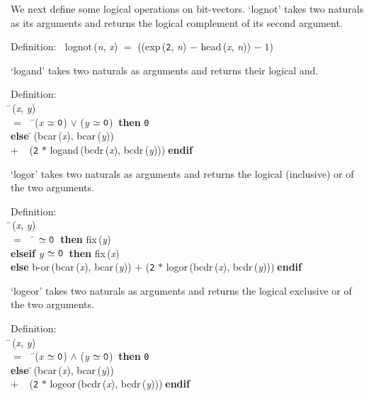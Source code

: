  We next define some logical operations on bit-vectors.  `lognot' takes
 two naturals as its arguments and returns the logical complement of its
 second argument.
\begin{tabbing}{\sc Definition}:$\;\;$
{\rm{lognot}}\,({\it{n\/}}, {\it{x\/}}) $=$ (({\rm{exp}}\,({\tt{2}}, {\it{n\/}}) $-$ {\rm{head}}\,({\it{x\/}}, {\it{n\/}})) $-\;1$)
\end{tabbing}

 `logand' takes two naturals as arguments and returns their logical and.
\begin{tabbing}{\sc Definition}: \\  
\=\,({\it{x\/}}, {\it{y\/}}) \\ 
$=$$\;\;\;\;$\=({\it{x\/}} $\simeq {\tt{0}}$) $\vee$ ({\it{y\/}} $\simeq {\tt{0}}$)$\;\;${\bf then }{\tt{0}} \\ 
{\bf else }\=\,({\rm{bcar}}\,({\it{x\/}}), {\rm{bcar}}\,({\it{y\/}})) \\ 
$+$$\;\;\;\;$({\tt{2}} $*$ {\rm{logand}}\,({\rm{bcdr}}\,({\it{x\/}}), {\rm{bcdr}}\,({\it{y\/}})))\-$\;${\bf  endif}\-\-
\end{tabbing}

 `logor' takes two naturals as arguments and returns the logical
 (inclusive) or of the two arguments.
\begin{tabbing}{\sc Definition}: \\  
\=\,({\it{x\/}}, {\it{y\/}}) \\ 
$=$$\;\;\;\;$\= $\simeq {\tt{0}}$$\;\;${\bf then }{\rm{fix}}\,({\it{y\/}}) \\ 
{\bf elseif }{\it{y\/}} $\simeq {\tt{0}}$$\;\;${\bf then }{\rm{fix}}\,({\it{x\/}}) \\ 
{\bf else }{\rm{b-or}}\,({\rm{bcar}}\,({\it{x\/}}), {\rm{bcar}}\,({\it{y\/}})) $+$ ({\tt{2}} $*$ {\rm{logor}}\,({\rm{bcdr}}\,({\it{x\/}}), {\rm{bcdr}}\,({\it{y\/}})))$\;${\bf  endif}\-\-
\end{tabbing}

 `logeor' takes two naturals as arguments and returns the logical
 exclusive or of the two arguments.
\begin{tabbing}{\sc Definition}: \\  
\=\,({\it{x\/}}, {\it{y\/}}) \\ 
$=$$\;\;\;\;$\=({\it{x\/}} $\simeq {\tt{0}}$) $\wedge$ ({\it{y\/}} $\simeq {\tt{0}}$)$\;\;${\bf then }{\tt{0}} \\ 
{\bf else }\=\,({\rm{bcar}}\,({\it{x\/}}), {\rm{bcar}}\,({\it{y\/}})) \\ 
$+$$\;\;\;\;$({\tt{2}} $*$ {\rm{logeor}}\,({\rm{bcdr}}\,({\it{x\/}}), {\rm{bcdr}}\,({\it{y\/}})))\-$\;${\bf  endif}\-\-
\end{tabbing}

